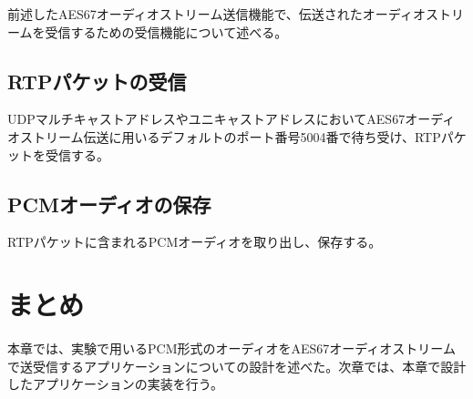 前述したAES67オーディオストリーム送信機能で、伝送されたオーディオストリームを受信するための受信機能について述べる。

\subsection{RTPパケットの受信}

UDPマルチキャストアドレスやユニキャストアドレスにおいてAES67オーディオストリーム伝送に用いるデフォルトのポート番号5004番で待ち受け、RTPパケットを受信する。

\subsection{PCMオーディオの保存}

RTPパケットに含まれるPCMオーディオを取り出し、保存する。

\section{まとめ}

本章では、実験で用いるPCM形式のオーディオをAES67オーディオストリームで送受信するアプリケーションについての設計を述べた。次章では、本章で設計したアプリケーションの実装を行う。
